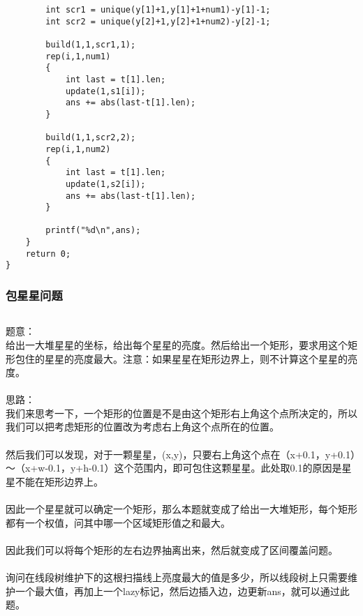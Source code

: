 \documentclass[twoside]{article}
\begin{document}
\begin{lstlisting}
		int scr1 = unique(y[1]+1,y[1]+1+num1)-y[1]-1;
		int scr2 = unique(y[2]+1,y[2]+1+num2)-y[2]-1;
 
		build(1,1,scr1,1);
		rep(i,1,num1)
		{
			int last = t[1].len;
			update(1,s1[i]);
			ans += abs(last-t[1].len);
		}
 
		build(1,1,scr2,2);
		rep(i,1,num2)
		{
			int last = t[1].len;
			update(1,s2[i]);
			ans += abs(last-t[1].len);
		}
 
		printf("%d\n",ans);
	}
	return 0;
}\end{lstlisting}
\subsubsection{包星星问题}
\begin{lstlisting}
\end{lstlisting}
题意：\\
给出一大堆星星的坐标，给出每个星星的亮度。然后给出一个矩形，要求用这个矩形包住的星星的亮度最大。注意：如果星星在矩形边界上，则不计算这个星星的亮度。\\
\\
思路：\\
我们来思考一下，一个矩形的位置是不是由这个矩形右上角这个点所决定的，所以我们可以把考虑矩形的位置改为考虑右上角这个点所在的位置。\\
\\
然后我们可以发现，对于一颗星星，(x,y)，只要右上角这个点在（x+0.1，y+0.1）～（x+w-0.1，y+h-0.1）这个范围内，即可包住这颗星星。此处取0.1的原因是星星不能在矩形边界上。\\
\\
因此一个星星就可以确定一个矩形，那么本题就变成了给出一大堆矩形，每个矩形都有一个权值，问其中哪一个区域矩形值之和最大。\\
\\
因此我们可以将每个矩形的左右边界抽离出来，然后就变成了区间覆盖问题。\\
\\
询问在线段树维护下的这根扫描线上亮度最大的值是多少，所以线段树上只需要维护一个最大值，再加上一个lazy标记，然后边插入边，边更新ans，就可以通过此题。\\
\end{document}
